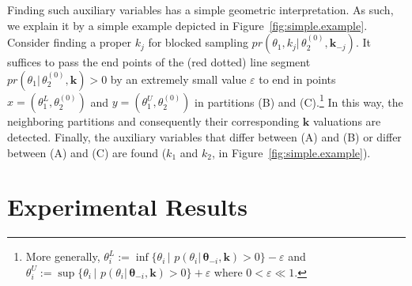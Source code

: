 \documentclass[letterpaper]{article}
\newcommand{\bvec}[1]{\textbf{#1}}
\begin{document}
Finding such auxiliary variables has a simple geometric interpretation. As 
such, we explain it by a simple 
example depicted in Figure~\ref{fig:simple.example}.
Consider finding a proper $k_j$ 
for blocked sampling $pr(\theta_1, k_j | \, 
\theta_2^{(0)}, \bvec{k}_{-j})$. 
It suffices to pass the end points of the (red dotted) line segment 
$pr(\theta_1 | \, \theta_2^{(0)}, \bvec{k})>0$ by an extremely small value $\varepsilon$ to end in points 
$x=(\theta_1^L, \theta_2^{(0)})$ and $y = (\theta_1^U, \theta_2^{(0)})$ 
in partitions (B) and (C).\footnote{More generally,  
$\theta_i^L := \inf   \{ \theta_i \,|\,\, p(\theta_i | \, \boldsymbol{\theta}_{-i}, \bvec{k})>0 \} - \varepsilon$
and $\theta_i^U := \sup \{ \theta_i \,|\,\, p(\theta_i | \, \boldsymbol{\theta}_{-i}, \bvec{k})>0 \} + \varepsilon$ where $0<\varepsilon \ll 1$.
}
In this way, the neighboring partitions and consequently 
their corresponding $\bvec{k}$ valuations are detected. 
Finally, the auxiliary variables that differ between (A) and (B) or differ between (A) and (C) are found ($k_1$ and $k_2$, in Figure~\ref{fig:simple.example}). 


\section{Experimental Results}
\label{sect:experiment}
\end{document}
